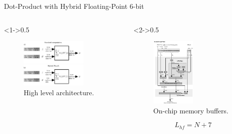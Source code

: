\begin{frame}{Dot-Product with Hybrid Floating-Point 6-bit}
	\begin{columns}[c] %
		
		\begin{column}<1->{0.5\textwidth}\centering
			\begin{figure}
				\includegraphics[width=0.75\textwidth]{../chapters/cnn_accelerator/figures/dot-product_unit.pdf} %
				\caption{\scriptsize High level architecture.}
			\end{figure}
		\end{column}
		
		\begin{column}<2->{0.5\textwidth}
			\begin{figure}
				\includegraphics[width=0.5\textwidth]{../chapters/cnn_accelerator/figures/multiplier.pdf} %
				\caption{\scriptsize On-chip memory buffers.}
			\end{figure}
		\scriptsize
		\[ L_{hf}=N+7 \]
		\end{column}
		
	\end{columns}
\end{frame}

